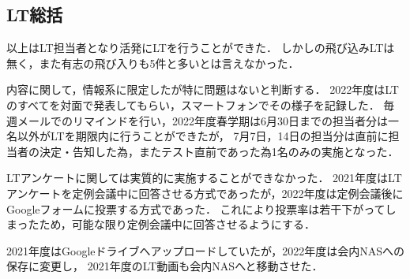 \subsection*{LT総括}


\secondGrade{}以上はLT担当者となり活発にLTを行うことができた．
しかし\firstGrade{}の飛び込みLTは無く，また有志の飛び入りも5件と多いとは言えなかった．

内容に関して，情報系に限定したが特に問題はないと判断する．
2022年度はLTのすべてを対面で発表してもらい，スマートフォンでその様子を記録した．
毎週メールでのリマインドを行い，2022年度春学期は6月30日までの担当者分は一名以外がLTを期限内に行うことができたが，
7月7日，14日の担当分は直前に担当者の決定・告知した為，またテスト直前であった為1名のみの実施となった．

LTアンケートに関しては実質的に実施することができなかった．
2021年度はLTアンケートを定例会議中に回答させる方式であったが，2022年度は定例会議後にGoogleフォームに投票する方式であった．
これにより投票率は若干下がってしまったため，可能な限り定例会議中に回答させるようにする．

2021年度はGoogleドライブへアップロードしていたが，2022年度は会内NASへの保存に変更し，
2021年度のLT動画も会内NASへと移動させた．
